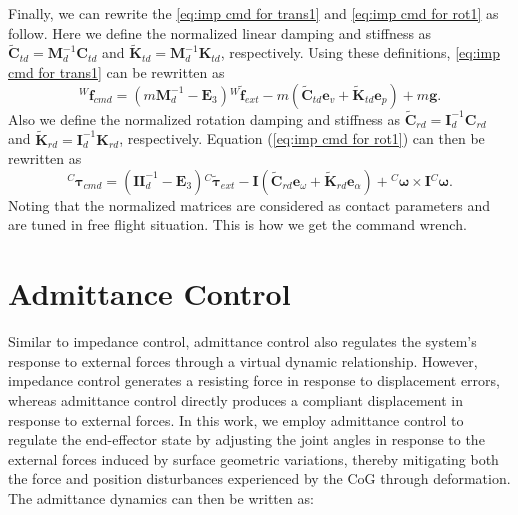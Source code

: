 Finally, we can rewrite the \ref{eq:imp cmd for trans1} and \ref{eq:imp cmd for rot1} as follow.  Here we define the normalized linear damping and stiffness as $\tilde{\boldsymbol{C}}_{td} = \boldsymbol{M}^{-1}_d\boldsymbol{C}_{td}$ and $\tilde{\boldsymbol{K}}_{td} = \boldsymbol{M}^{-1}_d\boldsymbol{K}_{td}$, respectively. Using these definitions, \eqref{eq:imp cmd for trans1} can be rewritten as
\begin{equation}
\label{eq:imp cmd for trans2}
    {^W\!\boldsymbol{f}_{cmd}}=(m\boldsymbol{M}^{-1}_d-\boldsymbol{E}_3){^W\!\boldsymbol{\tilde{f}}_{ext}}-m(\tilde{\boldsymbol{C}}_{td}{\boldsymbol{e}_v}+{\tilde{\boldsymbol{K}}_{td}}{\boldsymbol{e}_p})+m\boldsymbol{g}.
\end{equation}
Also we define the normalized rotation damping and stiffness as $\tilde{\boldsymbol{C}}_{rd} = \boldsymbol{I}^{-1}_d\boldsymbol{C}_{rd}$ and $\tilde{\boldsymbol{K}}_{rd} = \boldsymbol{I}^{-1}_d\boldsymbol{K}_{rd}$, respectively. Equation (\ref{eq:imp cmd for rot1}) can then be rewritten as
\begin{equation}
\label{eq:imp cmd for rot2}
    {^{C}\boldsymbol{\tau}_{cmd}}=(\boldsymbol{I}\boldsymbol{I}^{-1}_d-\boldsymbol{E}_3){^{C}}\boldsymbol{\tilde{\tau}}_{ext}-\boldsymbol{I}(\tilde{\boldsymbol{C}}_{rd}{\boldsymbol{e}_\omega}+\tilde{\boldsymbol{K}}_{rd}{\boldsymbol{e}_\alpha})
    +{^{C}\boldsymbol{\omega}} \times \boldsymbol{I}{^{C}\boldsymbol{\omega}}.
\end{equation}
Noting that the normalized matrices are considered as contact parameters and are tuned in free flight situation. This is how we get the command wrench.

\section{Admittance Control}
Similar to impedance control, admittance control also regulates the system’s response to external forces through a virtual dynamic relationship. However, impedance control generates a resisting force in response to displacement errors, whereas admittance control directly produces a compliant displacement in response to external forces. In this work, we employ admittance control to regulate the end-effector state by adjusting the joint angles in response to the external forces induced by surface geometric variations, thereby mitigating both the force and position disturbances experienced by the CoG through deformation.  The admittance dynamics can then be written as:



